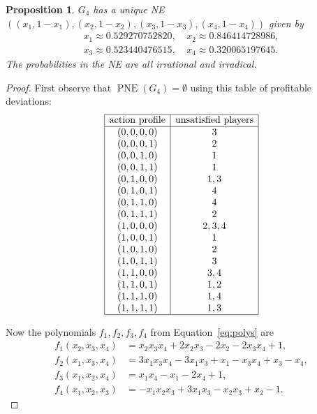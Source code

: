 \documentclass[preprint,12pt,authoryear]{elsarticle}
\newtheorem{proposition}[theorem]{Proposition}
\DeclareMathOperator{\PNE}{PNE}
\begin{document}
\begin{proposition}\label{prop:n=4}
  $G_4$ has a unique NE $((x_1,1-x_1),(x_2,1-x_2),(x_3,1-x_3),(x_4,1-x_4))$ given by
  \begin{align*}
    x_1\approx0.529270752820,&~x_2\approx0.846414728986,\\
    x_3\approx0.523440476515,&~x_4\approx0.320065197645.
  \end{align*}
  The probabilities in the NE are all irrational and irradical.
\end{proposition}
\begin{proof}
  First observe that $\PNE(G_4)=\emptyset$ using this table of profitable deviations:
  \begin{align*}
    \begin{array}{|c|c|}
      \hline
      \text{action profile}&\text{unsatisfied players}\\
      \hline
      (0,0,0,0)&3\\
      (0,0,0,1)&2\\
      (0,0,1,0)&1\\
      (0,0,1,1)&1\\
      (0,1,0,0)&1,3\\
      (0,1,0,1)&4\\
      (0,1,1,0)&4\\
      (0,1,1,1)&2\\
      (1,0,0,0)&2,3,4\\
      (1,0,0,1)&1\\
      (1,0,1,0)&2\\
      (1,0,1,1)&3\\
      (1,1,0,0)&3,4\\
      (1,1,0,1)&1,2\\
      (1,1,1,0)&1,4\\
      (1,1,1,1)&1,3\\
      \hline
    \end{array}
  \end{align*}
  
  Now the polynomials $f_1,f_2,f_3,f_4$ from Equation~\ref{eq:polys} are
  \begin{align*}
    f_1(x_2,x_3,x_4)&=x_2x_3x_4+2x_2x_3-2x_2-2x_3x_4+1,\\
    f_2(x_1,x_3,x_4)&=3x_1x_3x_4-3x_1x_3+x_1-x_3x_4+x_3-x_4,\\
    f_3(x_1,x_2,x_4)&=x_1x_4-x_1-2x_4+1,\\
    f_4(x_1,x_2,x_3)&=-x_1x_2x_3+3x_1x_3-x_2x_3+x_2-1.
  \end{align*}


\end{proof}
\end{document}
